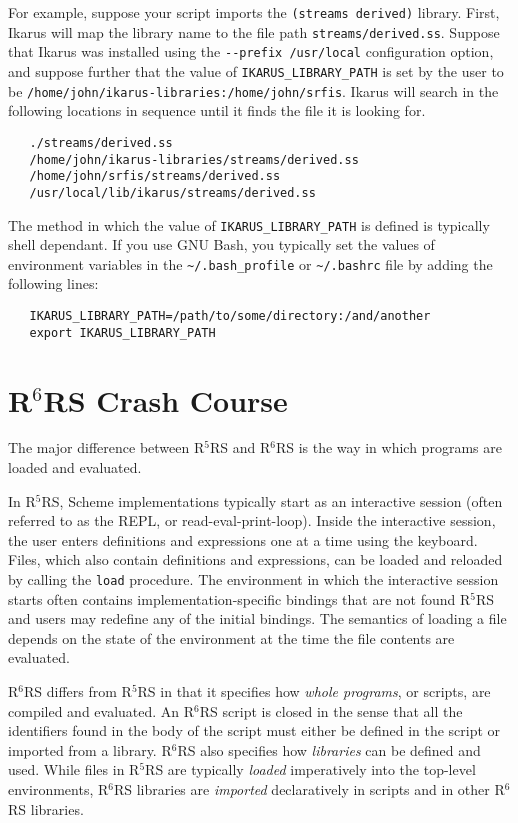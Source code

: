 \documentclass[onecolumn, 12pt, twoside, openright, dvipdfm]{book}
\newcommand{\rnrs}[1]{R$^{\mathrm{#1}}$RS}
\begin{document}
For example, suppose your script imports the
\texttt{(streams~derived)} library.  First, Ikarus will map the
library name to the file path \verb|streams/derived.ss|.  Suppose
that Ikarus was installed using the \verb|--prefix /usr/local|
configuration option, and suppose further that the value of
\verb|IKARUS_LIBRARY_PATH| is set by the user to be 
\verb|/home/john/ikarus-libraries:/home/john/srfis|.  Ikarus will
search in the following locations in sequence until it finds the
file it is looking for.

\begin{verbatim}
   ./streams/derived.ss
   /home/john/ikarus-libraries/streams/derived.ss
   /home/john/srfis/streams/derived.ss
   /usr/local/lib/ikarus/streams/derived.ss
\end{verbatim}


The method in which the value of \verb|IKARUS_LIBRARY_PATH| is
defined is typically shell dependant.  If you use GNU Bash, you
typically set the values of environment variables in the
\verb|~/.bash_profile| or \verb|~/.bashrc| file by adding the
following lines:

\begin{verbatim}
   IKARUS_LIBRARY_PATH=/path/to/some/directory:/and/another
   export IKARUS_LIBRARY_PATH
\end{verbatim}


\chapter{\rnrs{6} Crash Course}

The major difference between \rnrs{5} and \rnrs{6} is the way
in which programs are loaded and evaluated.  

In \rnrs{5}, Scheme implementations typically start as an
interactive session (often referred to as the REPL, or
read-eval-print-loop).  Inside the interactive session, the user
enters definitions and expressions one at a time using the keyboard.
Files, which also contain definitions and expressions, can be loaded
and reloaded by calling the \texttt{load} procedure.  The
environment in which the interactive session starts often contains
implementation-specific bindings that are not found \rnrs{5} and
users may redefine any of the initial bindings.  The semantics of 
loading a file depends on the state of the environment at the time
the file contents are evaluated.

\index{R6RS Script@\rnrs{6} Script!Import} 
%
\rnrs{6} differs from \rnrs{5} in that it specifies how \emph{whole
programs}, or scripts, are compiled and evaluated.  An \rnrs{6}
script is closed in the sense that all the identifiers found in the
body of the script must either be defined in the script or imported
from a library.  \rnrs{6} also specifies how \emph{libraries} can be
defined and used.  While files in \rnrs{5} are typically
\emph{loaded} imperatively into the top-level environments, \rnrs{6}
libraries are \emph{imported} declaratively in scripts and in other
\rnrs{6} libraries. 
\end{document}
